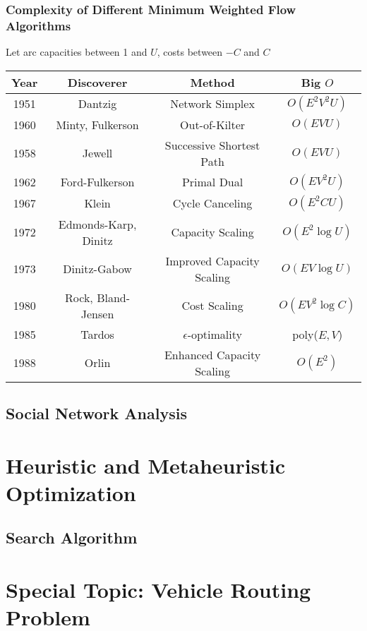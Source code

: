 			\section{Complexity of Different Minimum Weighted Flow Algorithms}
				Let arc capacities between 1 and $U$, costs between $-C$ and $C$
				\begin{table*}[ht]
					\centering
					\begin{tabular} {|c|c|c|c|}
						\hline
						Year & Discoverer & Method & Big $O$ \\
						\hline
						1951 & Dantzig & Network Simplex & $O(E^2V^2U)$ \\
						1960 & Minty, Fulkerson & Out-of-Kilter & $O(EVU)$\\
						1958 & Jewell & Successive Shortest Path & $O(EVU)$ \\
						1962 & Ford-Fulkerson & Primal Dual & $O(EV^2U)$ \\
						1967 & Klein & Cycle Canceling & $O(E^2CU)$ \\
						1972 & Edmonds-Karp, Dinitz & Capacity Scaling & $O(E^2 \log U)$\\
						1973 & Dinitz-Gabow & Improved Capacity Scaling & $O(EV\log U)$ \\
						1980 & Rock, Bland-Jensen & Cost Scaling & $O(EV^2\log C)$\\
						1985 & Tardos & $\epsilon$-optimality & poly($E,V$)\\
						1988 & Orlin & Enhanced Capacity Scaling & $O(E^2)$ \\
						\hline
					\end{tabular}
				\end{table*}

		\chapter{Social Network Analysis}

	\part{Heuristic and Metaheuristic Optimization}\label{Heur}
		\chapter{Search Algorithm}

	\part*{Special Topic: Vehicle Routing Problem}\label{VRP}
